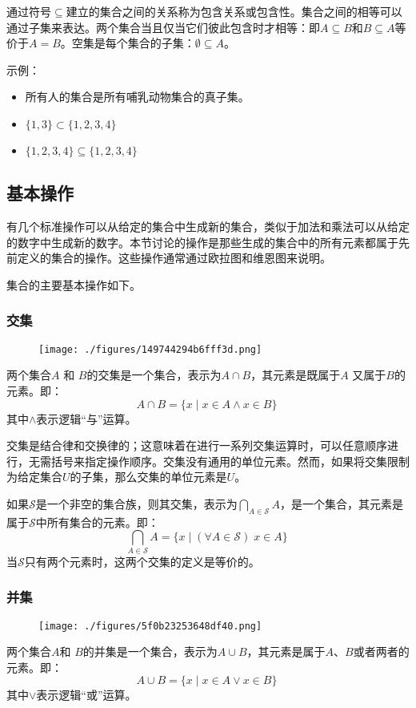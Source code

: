 通过符号\( \subseteq \)建立的集合之间的关系称为包含关系或包含性。集合之间的相等可以通过子集来表达。两个集合当且仅当它们彼此包含时才相等：即\( A \subseteq B \)和\( B \subseteq A \)等价于\( A = B \)。空集是每个集合的子集：\( \emptyset \subseteq A \)。

示例：
\begin{itemize}
\item 所有人的集合是所有哺乳动物集合的真子集。
\item \( \{1, 3\} \subset \{1, 2, 3, 4\} \)
\item \( \{1, 2, 3, 4\} \subseteq \{1, 2, 3, 4\} \)
\end{itemize}
\subsection{基本操作}
有几个标准操作可以从给定的集合中生成新的集合，类似于加法和乘法可以从给定的数字中生成新的数字。本节讨论的操作是那些生成的集合中的所有元素都属于先前定义的集合的操作。这些操作通常通过欧拉图和维恩图来说明。

集合的主要基本操作如下。
\subsubsection{交集}
\begin{figure}[ht]
\centering
\texttt{[image: ./figures/149744294b6fff3d.png]}
\caption{} \label{fig_JHSX_4}
\end{figure}
两个集合\( A \) 和 \( B \)的交集是一个集合，表示为\( A \cap B \)，其元素是既属于\( A \) 又属于\( B \)的元素。即：
\[
A \cap B = \{x \mid x \in A \land x \in B\}~
\]
其中\( \land \)表示逻辑“与”运算。

交集是结合律和交换律的；这意味着在进行一系列交集运算时，可以任意顺序进行，无需括号来指定操作顺序。交集没有通用的单位元素。然而，如果将交集限制为给定集合\( U \)的子集，那么交集的单位元素是\( U \)。

如果\( \mathcal{S} \)是一个非空的集合族，则其交集，表示为\( \bigcap_{A \in \mathcal{S}} A \)，是一个集合，其元素是属于\( \mathcal{S} \)中所有集合的元素。即：
\[
\bigcap_{A \in \mathcal{S}} A = \{x \mid (\forall A \in \mathcal{S})\; x \in A\}~
\]
当\( \mathcal{S} \)只有两个元素时，这两个交集的定义是等价的。
\subsubsection{并集}
\begin{figure}[ht]
\centering
\texttt{[image: ./figures/5f0b23253648df40.png]}
\caption{} \label{fig_JHSX_5}
\end{figure}
两个集合\( A \)和 \( B \)的并集是一个集合，表示为\( A \cup B \)，其元素是属于\( A \)、\( B \)或者两者的元素。即：
\[
A \cup B = \{x \mid x \in A \lor x \in B\}~
\]
其中\( \lor \)表示逻辑“或”运算。

